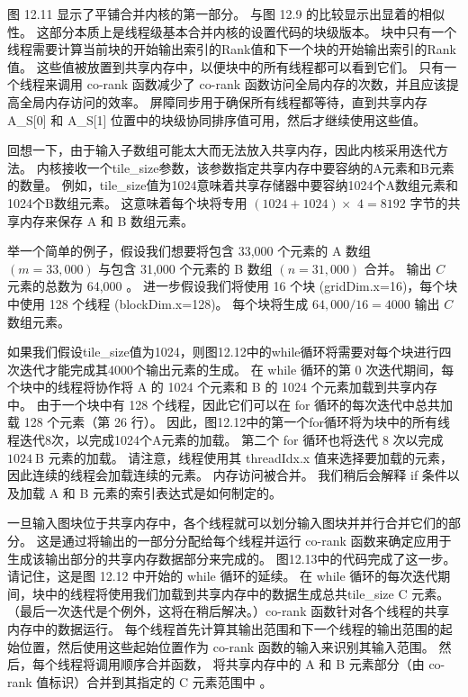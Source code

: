 图 12.11 显示了平铺合并内核的第一部分。 与图 12.9 的比较显示出显着的相似性。 
这部分本质上是线程级基本合并内核的设置代码的块级版本。 
块中只有一个线程需要计算当前块的开始输出索引的Rank值和下一个块的开始输出索引的Rank值。 
这些值被放置到共享内存中，以便块中的所有线程都可以看到它们。 
只有一个线程来调用 co-rank 函数减少了 co-rank 函数访问全局内存的次数，并且应该提高全局内存访问的效率。 
屏障同步用于确保所有线程都等待，直到共享内存 A\_S[0] 和 A\_S[1] 位置中的块级协同排序值可用，然后才继续使用这些值。

回想一下，由于输入子数组可能太大而无法放入共享内存，因此内核采用迭代方法。 
内核接收一个tile\_size参数，该参数指定共享内存中要容纳的$\mathrm{A}$元素和$\mathrm{B}$元素的数量。 
例如，tile\_size值为1024意味着共享存储器中要容纳1024个A数组元素和1024个B数组元素。 
这意味着每个块将专用 $(1024+1024) \times$ $4=8192$ 字节的共享内存来保存 A 和 B 数组元素。

举一个简单的例子，假设我们想要将包含 33,000 个元素的 A 数组 $(m=33,000)$ 与包含 31,000 个元素的 B 数组 $(n=31,000)$ 合并。 输出 $C$ 元素的总数为 64,000 。 
进一步假设我们将使用 16 个块 (gridDim.x=16)，每个块中使用 128 个线程 (blockDim.x=128)。 
每个块将生成 $64,000 / 16=4000$ 输出 $C$ 数组元素。

如果我们假设tile\_size值为1024，则图12.12中的while循环将需要对每个块进行四次迭代才能完成其4000个输出元素的生成。 
在 while 循环的第 0 次迭代期间，每个块中的线程将协作将 A 的 1024 个元素和 B 的 1024 个元素加载到共享内存中。 
由于一个块中有 128 个线程，因此它们可以在 for 循环的每次迭代中总共加载 128 个元素（第 26 行）。 
因此，图12.12中的第一个for循环将为块中的所有线程迭代8次，以完成1024个A元素的加载。 
第二个 for 循环也将迭代 8 次以完成 $1024 \mathrm{~B}$ 元素的加载。 
请注意，线程使用其 threadIdx.x 值来选择要加载的元素，因此连续的线程会加载连续的元素。 
内存访问被合并。 我们稍后会解释 if 条件以及加载 A 和 B 元素的索引表达式是如何制定的。

一旦输入图块位于共享内存中，各个线程就可以划分输入图块并并行合并它们的部分。 
这是通过将输出的一部分分配给每个线程并运行 co-rank 函数来确定应用于生成该输出部分的共享内存数据部分来完成的。 
图12.13中的代码完成了这一步。 请记住，这是图 12.12 中开始的 while 循环的延续。 
在 while 循环的每次迭代期间，块中的线程将使用我们加载到共享内存中的数据生成总共tile\_size $\mathrm{C}$ 元素。 
（最后一次迭代是个例外，这将在稍后解决。）co-rank 函数针对各个线程的共享内存中的数据运行。 
每个线程首先计算其输出范围和下一个线程的输出范围的起始位置，然后使用这些起始位置作为 co-rank 函数的输入来识别其输入范围。 
然后，每个线程将调用顺序合并函数，
将共享内存中的 $\mathrm{A}$ 和 B 元素部分（由 co-rank 值标识）合并到其指定的 $\mathrm{C}$ 元素范围中 。


